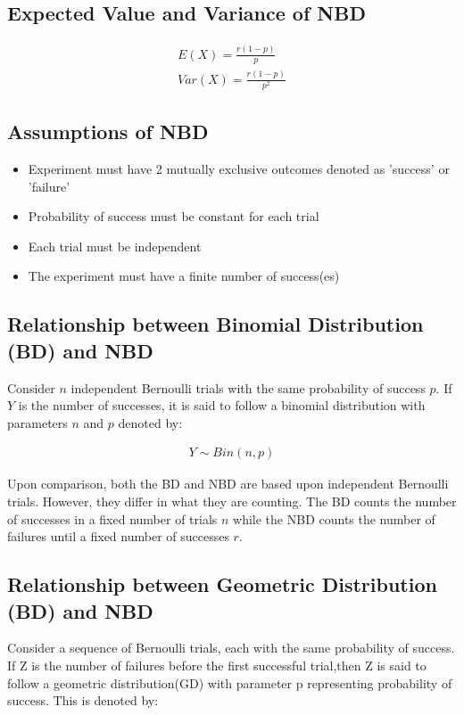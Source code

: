 \documentclass{article}
\begin{document}
\subsection{Expected Value and Variance of NBD}
\begin{gather*}
  E(X) = \frac{r(1-p)}{p} \\[5pt]
  Var(X) = \frac{r(1-p)}{p^2}
\end{gather*}

\subsection{Assumptions of NBD}
\begin{itemize}
  \item Experiment must have 2 mutually exclusive outcomes denoted as
    'success' or 'failure'
  \item Probability of success must be constant for each trial
  \item Each trial must be independent
  \item The experiment must have a finite number of success(es)
\end{itemize}

\subsection{Relationship between Binomial Distribution (BD) and NBD}
Consider $ n $ independent Bernoulli trials with the same probability 
of success $ p $. If $ Y $ is the number of successes, it is said
to follow a binomial distribution with parameters $ n $ and $ p $
denoted by:



\begin{gather*}
  Y \sim Bin(n, p)
\end{gather*}

Upon comparison, both the BD and NBD are based upon independent 
Bernoulli trials. However, they differ in what they are counting.
The BD counts the number of successes in a fixed number of 
trials $ n $ while the NBD counts the number of failures until
a fixed number of successes $ r $.

\subsection{Relationship between Geometric Distribution (BD) and NBD}
Consider a sequence of Bernoulli trials, each with the same probability 
of success. If Z is the number of failures before the first successful 
trial,then Z is said to follow a geometric distribution(GD) with parameter 
p representing probability of success. This is denoted by:
\end{document}

